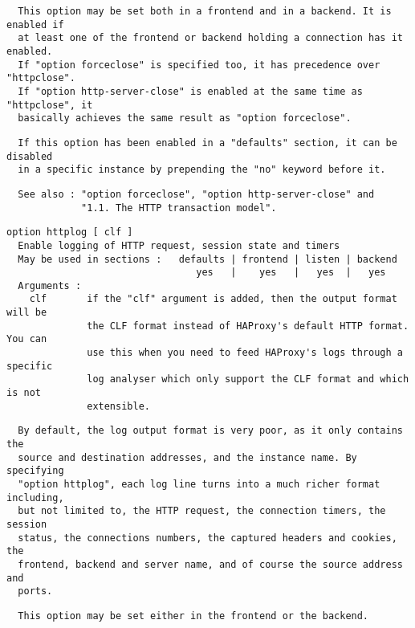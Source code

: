 \begin{verbatim}
  This option may be set both in a frontend and in a backend. It is enabled if
  at least one of the frontend or backend holding a connection has it enabled.
  If "option forceclose" is specified too, it has precedence over "httpclose".
  If "option http-server-close" is enabled at the same time as "httpclose", it
  basically achieves the same result as "option forceclose".
\end{verbatim}

\begin{verbatim}
  If this option has been enabled in a "defaults" section, it can be disabled
  in a specific instance by prepending the "no" keyword before it.
\end{verbatim}

\begin{verbatim}
  See also : "option forceclose", "option http-server-close" and
             "1.1. The HTTP transaction model".
\end{verbatim}

\begin{verbatim}
option httplog [ clf ]
  Enable logging of HTTP request, session state and timers
  May be used in sections :   defaults | frontend | listen | backend
                                 yes   |    yes   |   yes  |   yes
  Arguments :
    clf       if the "clf" argument is added, then the output format will be
              the CLF format instead of HAProxy's default HTTP format. You can
              use this when you need to feed HAProxy's logs through a specific
              log analyser which only support the CLF format and which is not
              extensible.
\end{verbatim}

\begin{verbatim}
  By default, the log output format is very poor, as it only contains the
  source and destination addresses, and the instance name. By specifying
  "option httplog", each log line turns into a much richer format including,
  but not limited to, the HTTP request, the connection timers, the session
  status, the connections numbers, the captured headers and cookies, the
  frontend, backend and server name, and of course the source address and
  ports.
\end{verbatim}

\begin{verbatim}
  This option may be set either in the frontend or the backend.
\end{verbatim}


